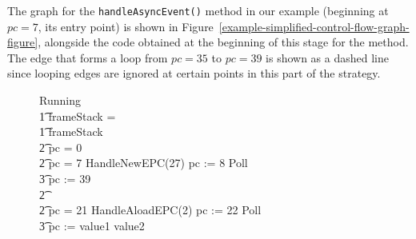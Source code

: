 The graph for the \texttt{handleAsyncEvent()} method in our example
(beginning at $pc=7$, its entry point) is shown in
Figure~\ref{example-simplified-control-flow-graph-figure}, alongside
the \Circus{} code obtained at the beginning of this stage for the
method.
The edge that forms a loop from $pc=35$ to $pc=39$ is shown as a
dashed line since looping edges are ignored at certain points in this
part of the strategy.
\begin{figure}
  \begin{center}
    \begin{minipage}{0.3\linewidth}
    \end{minipage}
    \begin{minipage}{0.65\linewidth}
      \scriptsize
      \setlength{\zedindent}{0cm}
      \begin{circus}
        Running \circdef \\
        \t1 \circif frameStack = \emptyset \circthen \Skip \\
        \t1 {} \circelse frameStack \neq \emptyset \circthen {} \\
        \t2 \circif pc = 0 \circthen {} \cdots {} \\
        \t2 {} \circelse pc = 7 \circthen HandleNewEPC(27) \circseq pc := 8 \circseq Poll \circseq \cdots \circseq \\
        \t3 pc := 39 \\
        \t2 {} \cdots {} \\
        \t2 {} \circelse pc = 21 \circthen HandleAloadEPC(2) \circseq pc := 22 \circseq Poll \circseq \cdots \circseq \\
        \t3 pc := \IF value1 \leq value2   \\

\end{circus}
\end{minipage}
\end{center}
\end{figure}
